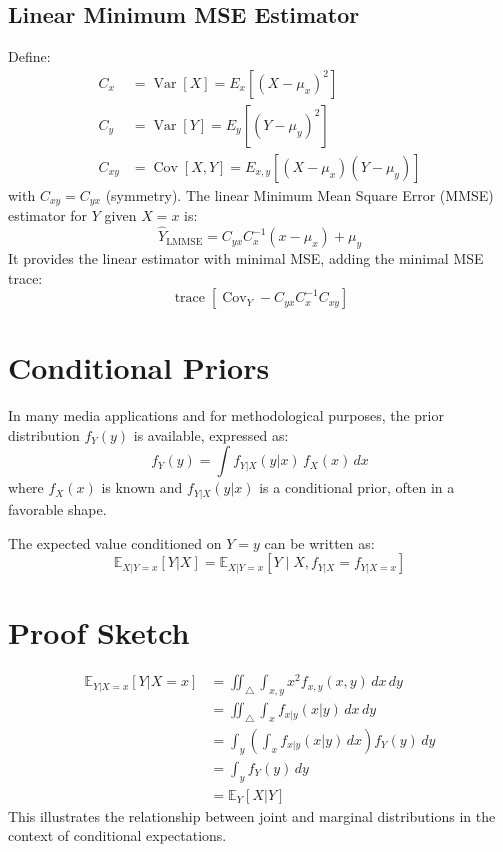 \documentclass[a4paper, 11pt]{article}
\begin{document}
\subsection{Linear Minimum MSE Estimator}
Define:
\begin{align}
C_x &= \operatorname{Var}[X] = E_x \left[ (X - \mu_x)^2 \right] \\
C_y &= \operatorname{Var}[Y] = E_y \left[ (Y - \mu_y)^2 \right] \\
C_{xy} &= \operatorname{Cov}[X,Y] = E_{x,y} \left[ (X - \mu_x)(Y - \mu_y) \right]
\end{align}
with $C_{xy} = C_{yx}$ (symmetry).  
The linear Minimum Mean Square Error (MMSE) estimator for $Y$ given $X = x$ is:
\begin{equation}
\boxed{
\hat{Y}_{\text{LMMSE}} = C_{yx} C_x^{-1} (x - \mu_x) + \mu_y
}
\end{equation}
It provides the linear estimator with minimal MSE, adding the minimal MSE trace:
\begin{equation}
\operatorname{trace}\left[\operatorname{Cov}_Y - C_{yx} C_x^{-1} C_{xy}\right]
\end{equation}

\section{Conditional Priors}
In many media applications and for methodological purposes, the prior distribution $f_Y(y)$ is available, expressed as:
\begin{equation}
f_Y(y) = \int f_{Y|X}(y|x) \, f_X(x) \, dx
\end{equation}
where $f_X(x)$ is known and $f_{Y|X}(y|x)$ is a conditional prior, often in a favorable shape.

The expected value conditioned on $Y = y$ can be written as:
\begin{equation}
\mathbb{E}_{X|Y=x}[Y|X] = \mathbb{E}_{X|Y=x}[Y \mid X, f_{Y|X}=f_{Y|X=x}]
\end{equation}

\section{Proof Sketch}
\begin{align}
\mathbb{E}_{Y|X=x}[Y|X=x] &= \iint_{\triangle} \int_{x,y} x^2 f_{x,y}(x,y) \, dx \, dy \\
&= \iint_{\triangle} \int_{x} f_{x|y}(x|y) \, dx \, dy \\
&= \int_{y} \left( \int_{x} f_{x|y}(x|y) \, dx \right) f_Y(y) \, dy \\
&= \int_{y} f_Y(y) \, dy \\
&= \mathbb{E}_Y[X|Y]
\end{align}
This illustrates the relationship between joint and marginal distributions in the context of conditional expectations.
\end{document}

